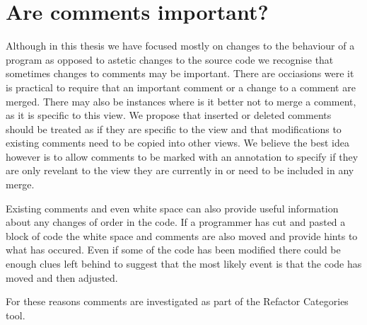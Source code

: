 \section{Are comments important?}
Although in this thesis we have focused mostly on changes to the behaviour of a program as opposed to astetic changes to the source code we recognise that sometimes changes to comments may be important.  There are occiasions were it is practical to require that an important comment or a change to a comment are merged.  There may also be instances where is it better not to merge a comment, as it is specific to this view.  We propose that inserted or deleted comments should be treated as if they are specific to the view and that modifications to existing comments need to be copied into other views.  We believe the best idea however is to allow comments to be marked with an annotation to specify if they are only revelant to the view they are currently in or need to be included in any merge. 

Existing comments and even white space can also provide useful information about any changes of order in the code.  If a programmer has cut and pasted a block of code the white space and comments are also moved and provide hints to what has occured.  Even if some of the code has been modified there could be enough clues left behind to suggest that the most likely event is that the code has moved and then adjusted.

For these reasons comments are investigated as part of the Refactor Categories tool.


